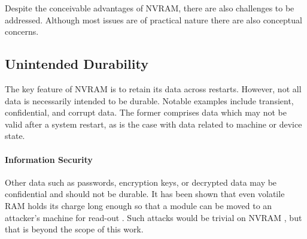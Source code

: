 Despite the conceivable advantages of \ac{NVRAM}, there are also challenges to
be addressed. Although most issues are of practical nature there are also
conceptual concerns.

\subsection{Unintended Durability}

The key feature of \ac{NVRAM} is to retain its data across restarts. However,
not all data is necessarily intended to be durable. Notable examples include
transient, confidential, and corrupt data. The former comprises data which may
not be valid after a system restart, as is the case with data related to machine
or device state.

\paragraph{Information Security}

Other data such as passwords, encryption keys, or decrypted data may be
confidential and should not be durable. It has been shown that even volatile
\ac{RAM} holds its charge long enough so that a module can be moved to an
attacker's machine for read-out \cite{halderman2008lest, yitbarek2017cold}. Such
attacks would be trivial on \ac{NVRAM} \cite{bailey2011operating}, but that is
beyond the scope of this work.


